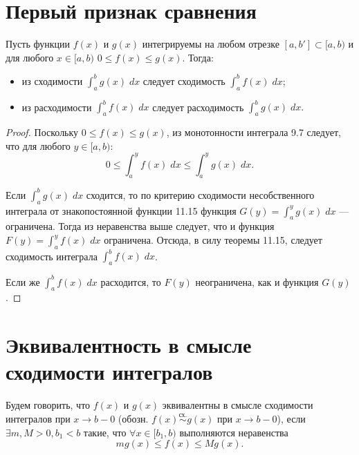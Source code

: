	\section{Первый признак сравнения}
	
	\begin{theorem}
		Пусть функции $f(x)$ и $g(x)$ интегрируемы на любом отрезке
		$[a, b'] \subset [a, b)$ и для любого $x \in [a, b)$ $0 \leqslant f(x) \leqslant g(x)$. Тогда:
		\begin{itemize}
			\item из сходимости $\displaystyle \int_a^b g(x) \; dx$ следует сходимость $\displaystyle \int_a^b f(x) \; dx$;
			\item из расходимости $\displaystyle \int_a^b f(x) \; dx$ следует расходимость $\displaystyle \int_a^b g(x) \; dx.$
		\end{itemize}
	\end{theorem}
	
	\begin{proof}
		Поскольку $0 \leqslant f(x) \leqslant g(x)$, из монотонности интеграла 9.7 следует, что для любого $y \in [a, b)$:
		\[ 0 \leqslant \int_a^y f(x) \; dx \leqslant \int_a^y g(x) \; dx. \]
		
		Если $\int_a^b g(x) \; dx$ сходится, то по критерию сходимости несобственного интеграла от знакопостоянной функции 11.15 функция $G(y) = \int_a^y g(x) \; dx$ — ограничена. Тогда из неравенства выше следует, что и функция $F(y) = \int_a^y f(x) \; dx$ ограничена. Отсюда, в силу теоремы 11.15, следует сходимость интеграла $\int_a^b f(x) \; dx$.
		
		Если же $\int_a^b f(x) \; dx$ расходится, то $F(y)$ неограничена, как и функция $G(y)$.
	\end{proof}
	
	\section{Эквивалентность в смысле сходимости интегралов}
	
	\begin{definition}
		Будем говорить, что $f(x)$ и $g(x)$ эквивалентны в смысле
		сходимости интегралов при $x \rightarrow b - 0$ (обозн. $f(x) \overset{\text{сх.}}{\sim} g(x)$ при $x \rightarrow b - 0$), если $\exists m, M > 0, b_1 < b$ такие, что $\forall x \in [b_1, b)$ выполняются неравенства
		\[ mg(x) \leqslant f(x) \leqslant Mg(x).\]
	\end{definition}
	
